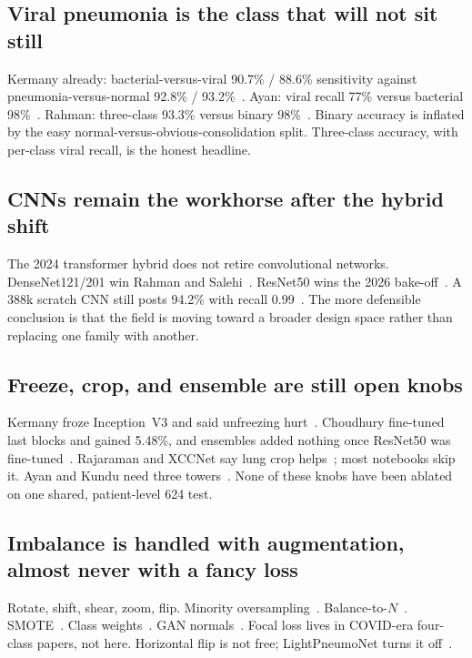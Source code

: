 \documentclass[11pt,a4paper]{article}
\begin{document}
\subsection{Viral pneumonia is the class that will not sit still}
Kermany already: bacterial-versus-viral 90.7\% / 88.6\% sensitivity against pneumonia-versus-normal 92.8\% / 93.2\%~\cite{kermany2018}. Ayan: viral recall 77\% versus bacterial 98\%~\cite{ayan2021}. Rahman: three-class 93.3\% versus binary 98\%~\cite{rahman2020}. Binary accuracy is inflated by the easy normal-versus-obvious-consolidation split. Three-class accuracy, with per-class viral recall, is the honest headline.

\subsection{CNNs remain the workhorse after the hybrid shift}
The 2024 transformer hybrid does not retire convolutional networks. DenseNet121/201 win Rahman and Salehi~\cite{rahman2020,salehi2021}. ResNet50 wins the 2026 bake-off~\cite{choudhury2026}. A 388k scratch CNN still posts 94.2\% with recall 0.99~\cite{chauhan2025}. The more defensible conclusion is that the field is moving toward a broader design space rather than replacing one family with another.

\subsection{Freeze, crop, and ensemble are still open knobs}
Kermany froze Inception~V3 and said unfreezing hurt~\cite{kermany2018}. Choudhury fine-tuned last blocks and gained 5.48\%, and ensembles added nothing once ResNet50 was fine-tuned~\cite{choudhury2026}. Rajaraman and XCCNet say lung crop helps~\cite{rajaraman2018,raghaw2024}; most notebooks skip it. Ayan and Kundu need three towers~\cite{ayan2021,kundu2021}. None of these knobs have been ablated on one shared, patient-level 624 test.

\subsection{Imbalance is handled with augmentation, almost never with a fancy loss}
Rotate, shift, shear, zoom, flip. Minority oversampling~\cite{ayan2021}. Balance-to-$N$~\cite{rahman2020}. SMOTE~\cite{salehi2021}. Class weights~\cite{chauhan2025}. GAN normals~\cite{raghaw2024}. Focal loss lives in COVID-era four-class papers, not here. Horizontal flip is not free; LightPneumoNet turns it off~\cite{chauhan2025}.
\end{document}
